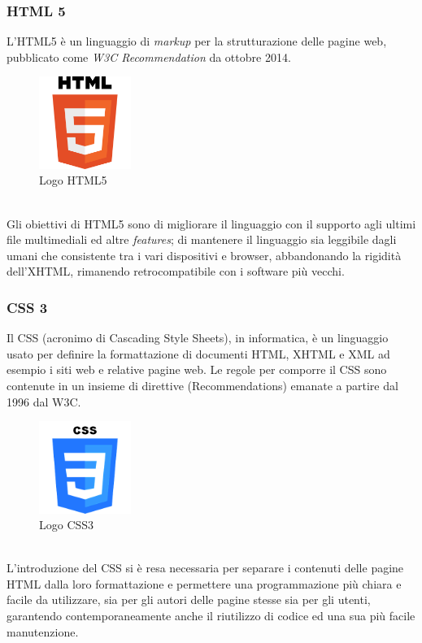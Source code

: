 \subsubsection{HTML 5}
L'HTML5 è un linguaggio di \textit{markup} per la strutturazione delle pagine web, pubblicato come \textit{W3C Recommendation} da ottobre 2014.
\\
\begin{figure}[!h] 
    \centering 
    \includegraphics[height=3cm]{immagini/loghi/html.png}
    \caption{Logo HTML5}
\end{figure}
\\
Gli obiettivi di HTML5 sono di migliorare il linguaggio con il supporto agli ultimi file multimediali ed altre \textit{features}; di mantenere il linguaggio sia leggibile dagli umani che consistente tra i vari dispositivi e browser, abbandonando la rigidità dell'XHTML, rimanendo retrocompatibile con i software più vecchi.


\subsubsection{CSS 3}
Il CSS (acronimo di Cascading Style Sheets), in informatica, è un linguaggio usato per definire la formattazione di documenti HTML, XHTML e XML ad esempio i siti web e relative pagine web. Le regole per comporre il CSS sono contenute in un insieme di direttive (Recommendations) emanate a partire dal 1996 dal W3C.
\\
\begin{figure}[!h] 
    \centering 
    \includegraphics[height=3cm ]{immagini/loghi/css.png}
    \caption{Logo CSS3}
\end{figure}
\\
L'introduzione del CSS si è resa necessaria per separare i contenuti delle pagine HTML dalla loro formattazione e permettere una programmazione più chiara e facile da utilizzare, sia per gli autori delle pagine stesse sia per gli utenti, garantendo contemporaneamente anche il riutilizzo di codice ed una sua più facile manutenzione.



